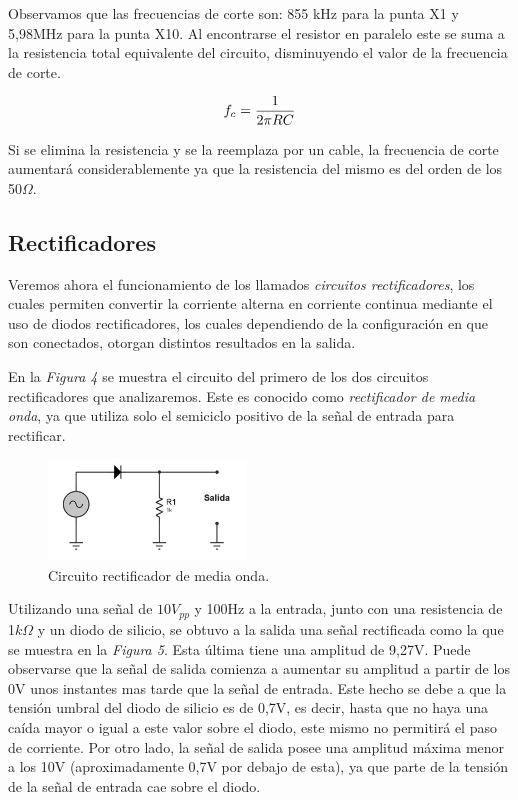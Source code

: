 \documentclass{article}
\begin{document}
	Observamos que las frecuencias de corte son: 855 kHz para la punta X1 y 5,98MHz para la punta X10. Al encontrarse el resistor en paralelo este se suma a la resistencia total equivalente del circuito, disminuyendo el valor de la frecuencia de corte.
	
	\begin{equation*}
		f_c = {1 \over 2 \pi RC}
	\end{equation*}
	\medskip
	
	Si se elimina la resistencia y se la reemplaza por un cable, la frecuencia de corte aumentará considerablemente ya que la resistencia del mismo es del orden de los 50$\Omega$.
\bigskip\bigskip\bigskip




\subsection{Rectificadores}
	
	Veremos ahora el funcionamiento de los llamados \textit{circuitos rectificadores}, los cuales permiten convertir la corriente alterna en corriente continua mediante el uso de diodos rectificadores, los cuales dependiendo de la configuración en que son conectados, otorgan distintos resultados en la salida. 
	\par
	En la \textit{Figura 4} se muestra el circuito del primero de los dos circuitos rectificadores que analizaremos. Este es conocido como \textit{rectificador de media onda}, ya que utiliza solo el semiciclo positivo de la señal de entrada para rectificar.
\bigskip\bigskip


\begin{figure}[h]
	\centering
	\includegraphics[width=0.47\textwidth]{images/4-4-1-circuito-rectificador-media-onda.jpg}
	\medskip
	\caption{Circuito rectificador de media onda.}
\end{figure}
\bigskip\bigskip


	Utilizando una señal de $10V_{pp}$ y 100Hz a la entrada, junto con una resistencia de 1$k\Omega$ y un diodo de silicio, se obtuvo a la salida una señal rectificada como la que se muestra en la \textit{Figura 5}. Esta última tiene una amplitud de 9,27V. Puede observarse que la señal de salida comienza a aumentar su amplitud a partir de los 0V unos instantes mas tarde que la señal de entrada. Este hecho se debe a que la tensión umbral del diodo de silicio es de 0,7V, es decir, hasta que no haya una caída mayor o igual a este valor sobre el diodo, este mismo no permitirá el paso de corriente. Por otro lado, la señal de salida posee una amplitud máxima menor a los 10V (aproximadamente 0,7V por debajo de esta), ya que parte de la tensión de la señal de entrada cae sobre el diodo.
\bigskip
\end{document}
